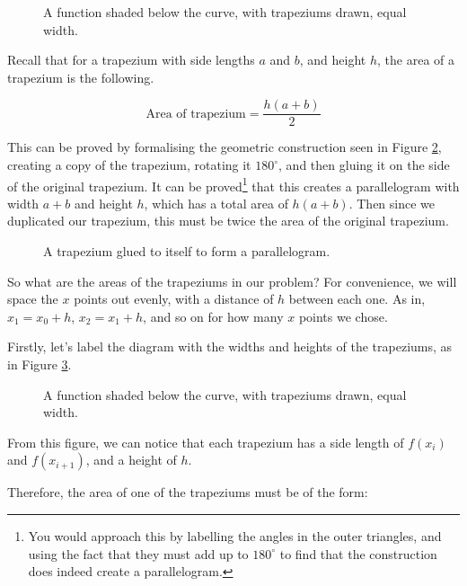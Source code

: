 \begin{figure}[H]
\centering
{}
\caption{A function shaded below the curve, with trapeziums drawn, equal width.}
\label{fig:shaded-function-with-trapz}
\end{figure}

Recall that for a trapezium with side lengths $a$ and $b$, and height $h$, the area of a trapezium is the following.

\[ \text{Area of trapezium} = \frac{h(a+b)}{2}\]

This can be proved by formalising the geometric construction seen in Figure \ref{fig:trapezium-geometric}, creating a copy of the trapezium, rotating it $180^\circ$, and then gluing it on the side of the original trapezium.
It can be proved\footnote{You would approach this by labelling the angles in the outer triangles, and using the fact that they must add up to $180^\circ$ to find that the construction does indeed create a parallelogram.} 
that this creates a parallelogram with width $a+b$ and height $h$, which has a total area of $h(a+b)$. Then since we duplicated our trapezium, this must be twice the area of the original trapezium.


\begin{figure}[H]
\centering
{}
\caption{A trapezium glued to itself to form a parallelogram.}
\label{fig:trapezium-geometric}
\end{figure}


So what are the areas of the trapeziums in our problem? For convenience, we will space the $x$ points out evenly, with a distance of $h$ between each one. 
As in, $x_1 = x_0 + h$, $x_2 = x_1 + h$, and so on for how many $x$ points we chose.

Firstly, let's label the diagram with the widths and heights of the trapeziums, as in Figure \ref{fig:shaded-function-with-trapz-labelled}.

\begin{figure}[H]
\centering
{}
\caption{A function shaded below the curve, with trapeziums drawn, equal width.}
\label{fig:shaded-function-with-trapz-labelled}
\end{figure}

From this figure, we can notice that each trapezium has a side length of $f(x_i)$ and $f(x_{i+1})$, and a height of $h$.

Therefore, the area of one of the trapeziums must be of the form:

